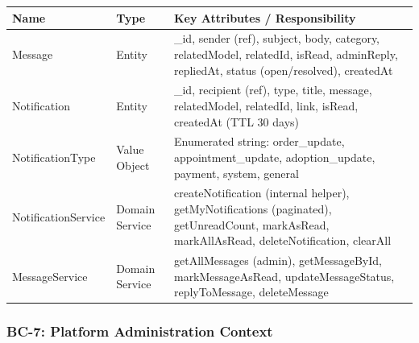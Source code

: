 \documentclass[12pt,a4paper]{article}
\begin{document}
\begin{center}
\begin{tabular}{@{}p{3.5cm}p{2cm}p{8.5cm}@{}}
\toprule
\textbf{Name} & \textbf{Type} & \textbf{Key Attributes / Responsibility} \\
\midrule
Message & Entity & \_id, sender (ref), subject, body, category, relatedModel, relatedId, isRead, adminReply, repliedAt, status (open/resolved), createdAt \\
Notification & Entity & \_id, recipient (ref), type, title, message, relatedModel, relatedId, link, isRead, createdAt (TTL 30 days) \\
NotificationType & Value Object & Enumerated string: order\_update, appointment\_update, adoption\_update, payment, system, general \\
NotificationService & Domain Service & createNotification (internal helper), getMyNotifications (paginated), getUnreadCount, markAsRead, markAllAsRead, deleteNotification, clearAll \\
MessageService & Domain Service & getAllMessages (admin), getMessageById, markMessageAsRead, updateMessageStatus, replyToMessage, deleteMessage \\
\bottomrule
\end{tabular}
\end{center}

\subsubsection{BC-7: Platform Administration Context}
\end{document}
